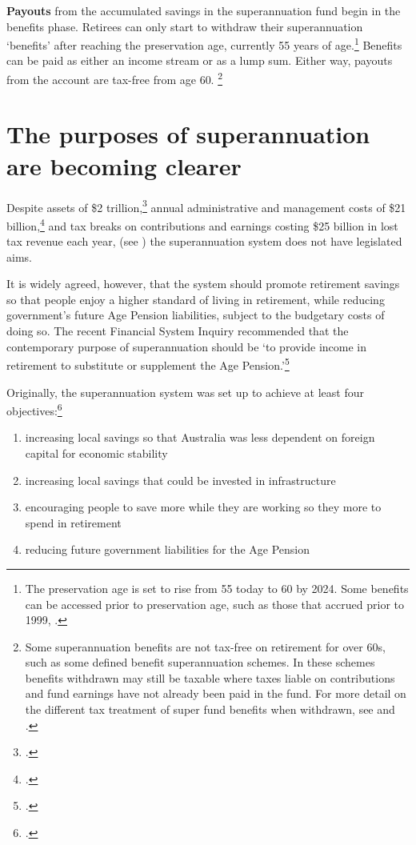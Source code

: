  \textbf{Payouts} from the accumulated savings in the superannuation fund begin in the benefits phase.  Retirees can only start to withdraw their superannuation ‘benefits’ after reaching the preservation age, currently 55 years of age.\footnote{The preservation age is set to rise from 55 today to 60 by 2024. Some benefits can be accessed prior to preservation age, such as those that accrued prior to 1999, \textcite{ATO2015WhenYouCanAccessYourSuper}.} Benefits can be paid as either an income stream or as a lump sum. Either way, payouts from the account are tax-free from age 60.%
 \footnote{Some superannuation benefits are not tax-free on retirement for over 60s, such as some defined benefit superannuation schemes. In these schemes benefits withdrawn may still be taxable where taxes liable on contributions and fund earnings have not already been paid in the fund. For more detail on the different tax treatment of super fund benefits when withdrawn, see \textcite{ATO2015HowTaxAppliesToSuper} and \textcite[][13]{Mercer2015SubmissionToReThink}.}

\FloatBarrier
 \section{The purposes of superannuation are becoming clearer}
 Despite assets of \$2 trillion,\footcite{APRA2015JuneSuperPerformance} annual administrative and management costs of \$21 billion,\footcite{MinifieSavageCameron2015} and tax breaks on contributions and earnings costing \$25 billion in lost tax revenue each year, ({see }) the superannuation system does not have legislated aims. 

It is widely agreed, however, that the system should promote retirement savings so that people enjoy a higher standard of living in retirement, while reducing government’s future Age Pension liabilities, subject to the budgetary costs of doing so. The recent Financial System Inquiry recommended that the contemporary purpose of superannuation should be ‘to provide income in retirement to substitute or supplement the Age Pension.’\footcite[][95]{FinancialSystemsInquiry2015}

 Originally, the superannuation system was set up to achieve at least four objectives:\footcite{Greenwood2010}
 \begin{enumerate}
\item increasing local savings so that Australia was less dependent on foreign capital for economic stability
\item increasing local savings that could be invested in infrastructure
\item encouraging people to save more while they are working so they more to spend in retirement
\item reducing future government liabilities for the Age Pension
 \end{enumerate}

